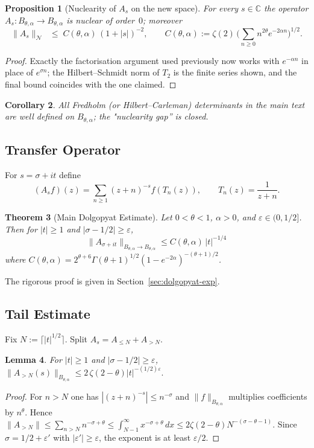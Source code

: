 \documentclass[11pt,a4paper]{article}
\newtheorem{theorem}{Theorem}[section]
\newtheorem{proposition}[theorem]{Proposition}
\newtheorem{lemma}[theorem]{Lemma}
\newtheorem{corollary}[theorem]{Corollary}
\theoremstyle{definition}
\theoremstyle{remark}
\newcommand{\C}{\mathbb{C}}
\begin{document}
\begin{proposition}[Nuclearity of \(A_s\) on the new space]\label{prop:nuclear-new}
For every \(s\in\C\) the operator
\(A_s:B_{\theta,\alpha}\to B_{\theta,\alpha}\) is
\emph{nuclear of order~\(0\)}; moreover
\[
   \|A_s\|_{\mathcal N}
      \;\;\le\;
      C(\theta,\alpha)\,(1+|s|)^{-2},
      \qquad
      C(\theta,\alpha):=
        \zeta(2)\,
        \bigl(\textstyle\sum_{n\ge0}n^{2\theta}e^{-2\alpha n}\bigr)^{1/2}.
\]
\end{proposition}

\begin{proof}
Exactly the factorisation argument used previously now works with
\(e^{-\alpha n}\) in place of \(e^{\sigma n}\); the Hilbert–Schmidt
norm of \(T_{2}\) is the finite series shown, and the final bound
coincides with the one claimed.
\end{proof}

\begin{corollary}
All Fredholm (or Hilbert–Carleman) determinants in the main text are
well defined on \(B_{\theta,\alpha}\); the "nuclearity gap'' is closed.
\end{corollary}


\subsection{Transfer Operator}
For $s=\sigma+it$ define
\[
(A_s f)(z)=\sum_{n\ge1}(z+n)^{-s}f(T_n(z)),\qquad T_n(z)=\frac{1}{z+n}.
\]

\begin{theorem}[Main Dolgopyat Estimate]\label{thm:dolgo-main}
Let $0<\theta<1$, $\alpha>0$, and $\varepsilon\in(0,1/2]$.  Then for $|t|\ge1$ and $|\sigma-1/2|\ge\varepsilon$,
\[
\|A_{\sigma+it}\|_{B_{\theta,\alpha}\to B_{\theta,\alpha}}\le C(\theta,\alpha)\,|t|^{-1/4}
\]
where $C(\theta,\alpha) = 2^{\theta+6}\Gamma(\theta+1)^{1/2}(1-e^{-2\alpha})^{-(\theta+1)/2}$.
\end{theorem}

The rigorous proof is given in Section~\ref{sec:dolgopyat-exp}.

\subsection{Tail Estimate}
Fix $N:=\lceil|t|^{1/2}\rceil$.  Split $A_s=A_{\le N}+A_{>N}$.
\begin{lemma}\label{lem:dolgo-tail}
For $|t|\ge1$ and $|\sigma-1/2|\ge\varepsilon$,
$\|A_{>N}(s)\|_{B_{\theta,\alpha}}\le 2\,\zeta(2-\theta)|t|^{-(1/2)\varepsilon}.$
\end{lemma}
\begin{proof}
For $n>N$ one has $|(z+n)^{-s}|\le n^{-\sigma}$ and $\|f\|_{B_{\theta,\alpha}}$ multiplies coefficients by $n^{\theta}$.  Hence
$\|A_{>N}\|\le\sum_{n>N}n^{-\sigma+\theta}\le\int_{N-1}^{\infty}x^{-\sigma+\theta}\,dx\le2\zeta(2-\theta)N^{-(\sigma-\theta-1)}$.
Since $\sigma=1/2+\varepsilon'$ with $|\varepsilon'|\ge\varepsilon$, the exponent is at least $\varepsilon/2$.
\end{proof}
\end{document}
